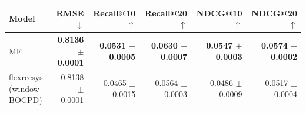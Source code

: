 \begin{tabular}{lrrrrr}
\toprule
Model & RMSE $\downarrow$ & Recall@10 $\uparrow$ & Recall@20 $\uparrow$ & NDCG@10 $\uparrow$ & NDCG@20 $\uparrow$ \\
\midrule
MF & \textbf{0.8136 $\pm$ 0.0001} & \textbf{0.0531 $\pm$ 0.0005} & \textbf{0.0630 $\pm$ 0.0007} & \textbf{0.0547 $\pm$ 0.0003} & \textbf{0.0574 $\pm$ 0.0002} \\
flexrecsys (window BOCPD) & 0.8138 $\pm$ 0.0001 & 0.0465 $\pm$ 0.0015 & 0.0564 $\pm$ 0.0003 & 0.0486 $\pm$ 0.0009 & 0.0517 $\pm$ 0.0004 \\
\bottomrule
\end{tabular}
